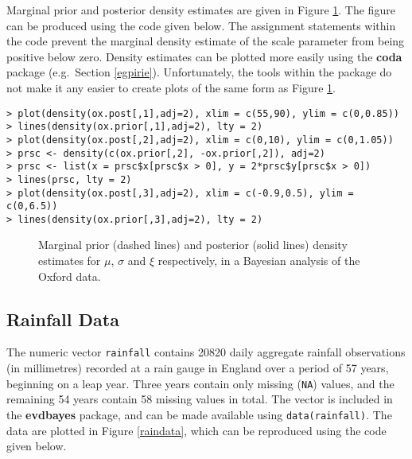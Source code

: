 \documentclass[11pt,a4paper]{article}
\begin{document}
Marginal prior and posterior density estimates are given in Figure \ref{oxdens}. 
The figure can be produced using the code given below.
The assignment statements within the code prevent the marginal density estimate of the scale parameter from being positive below zero. 
Density estimates can be plotted more easily using the \textbf{coda} package (e.g.\ Section \ref{egpirie}).
Unfortunately, the tools within the package do not make it any easier to create plots of the same form as Figure \ref{oxdens}.

\begin{verbatim}
> plot(density(ox.post[,1],adj=2), xlim = c(55,90), ylim = c(0,0.85))
> lines(density(ox.prior[,1],adj=2), lty = 2)
> plot(density(ox.post[,2],adj=2), xlim = c(0,10), ylim = c(0,1.05))
> prsc <- density(c(ox.prior[,2], -ox.prior[,2]), adj=2)
> prsc <- list(x = prsc$x[prsc$x > 0], y = 2*prsc$y[prsc$x > 0])
> lines(prsc, lty = 2)
> plot(density(ox.post[,3],adj=2), xlim = c(-0.9,0.5), ylim = c(0,6.5))
> lines(density(ox.prior[,3],adj=2), lty = 2)
\end{verbatim}

\begin{figure}
\begin{center}
\vspace{-1.5cm}
\hspace{0cm}
\hspace{0cm}
\end{center}
\caption{Marginal prior (dashed lines) and posterior (solid lines) density estimates for $\mu$, $\sigma$ and $\xi$ respectively, in a Bayesian analysis of the Oxford data.}
\label{oxdens}
\end{figure}

\subsection{Rainfall Data}
\label{egrain}

The numeric vector \verb+rainfall+ contains 20820 daily aggregate rainfall observations (in millimetres) recorded at a rain gauge in England over a period of 57 years, beginning on a leap year.
Three years contain only missing (\verb+NA+) values, and the remaining 54 years contain 58 missing values in total.
The vector is included in the \textbf{evdbayes} package, and can be made available using \verb+data(rainfall)+.
The data are plotted in Figure \ref{raindata}, which can be reproduced using the code given below.
\end{document}
